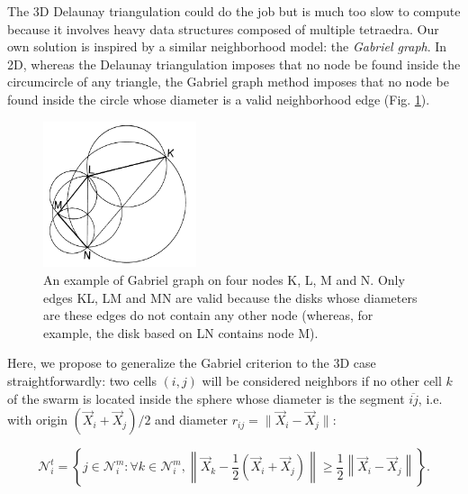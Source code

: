 The 3D Delaunay triangulation could do the job but is much too slow to compute because it involves heavy data structures composed of multiple tetraedra. Our own solution is inspired by a similar neighborhood model: the \textit{Gabriel graph}. In 2D, whereas the Delaunay triangulation imposes that no node be found inside the circumcircle of any triangle, the Gabriel graph method imposes that no node be found inside the circle whose diameter is a valid neighborhood edge (Fig. \ref{spatial_neighb_gabriel}).
\begin{figure}
\begin{center}
\includegraphics[width=0.4\textwidth]{../../images/MECAGEN/spatial_neighb/gabriel.png}
\end{center}
\caption{An example of Gabriel graph on four nodes K, L, M and N. Only edges KL, LM and MN are valid because the disks whose diameters are these edges do not contain any other node (whereas, for example, the disk based on LN contains node M).}
\label{spatial_neighb_gabriel}
\end{figure}

Here, we propose to generalize the Gabriel criterion to the 3D case straightforwardly: two cells $(i, j)$ will be considered neighbors if no other cell $k$ of the swarm is located inside the sphere whose diameter is the segment $\overline{ij}$, i.e. with origin $(\vec{X}_i + \vec{X}_j)/2$ and diameter $r_{ij}=\|\vec{X}_i - \vec{X}_j\|$:

$$\mathcal{N}^t_i = \left\{ j \in  \mathcal{N}^m_i: \forall k \in  \mathcal{N}^m_i, \left\| \vec{X}_k - \frac{1}{2}(\vec{X}_i + \vec{X}_j) \right \| \geq \frac{1}{2}\left\| \vec{X}_i - \vec{X}_j \right\| \right\}.$$

